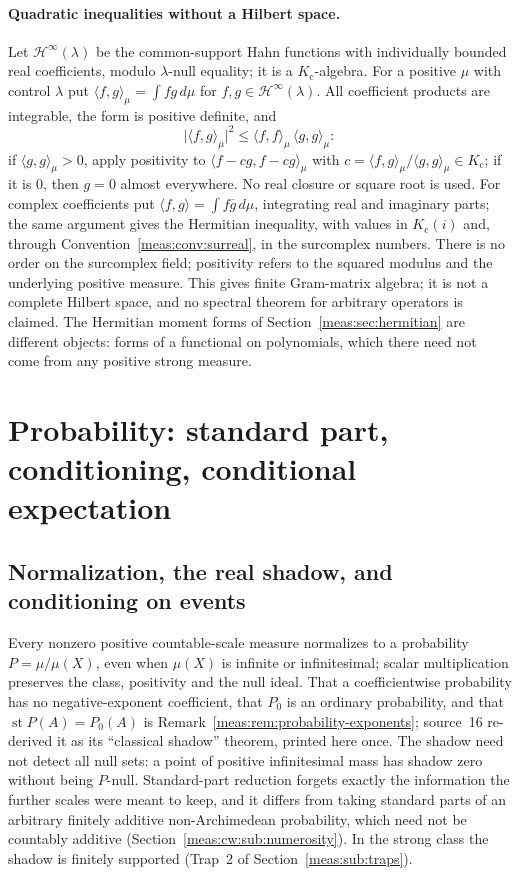 \documentclass[11pt]{article}
\numberwithin{equation}{section}
\theoremstyle{definition}
\theoremstyle{remark}
\newcommand{\st}{\operatorname{st}}
\newcommand{\abs}[1]{\lvert#1\rvert}
\newcommand{\inner}[2]{\langle#1,#2\rangle}
\newcommand{\Kc}{K_{\mathrm c}}
\newcommand{\Hinf}[1]{\mathscr H^\infty(#1)}
\begin{document}
\paragraph{Quadratic inequalities without a Hilbert space.} Let $\Hinf{\lambda}$ be
the common-support Hahn functions with individually bounded real coefficients,
modulo $\lambda$-null equality; it is a $\Kc$-algebra. For a positive $\mu$ with
control $\lambda$ put $\inner fg_\mu=\int fg\,d\mu$ for $f,g\in\Hinf{\lambda}$. All
coefficient products are integrable, the form is positive definite, and
\begin{equation}\label{meas:cw:eq:cs}
 \abs{\inner fg_\mu}^2\le\inner ff_\mu\,\inner gg_\mu :
\end{equation}
if $\inner gg_\mu>0$, apply positivity to $\inner{f-cg}{f-cg}_\mu$ with
$c=\inner fg_\mu/\inner gg_\mu\in\Kc$; if it is $0$, then $g=0$ almost everywhere. No
real closure or square root is used. For complex coefficients put
$\inner fg=\int f\overline g\,d\mu$, integrating real and imaginary parts; the same
argument gives the Hermitian inequality, with values in $\Kc(i)$ and, through
Convention~\ref{meas:conv:surreal}, in the surcomplex numbers. There is no order
on the surcomplex field; positivity refers to the squared modulus and the
underlying positive measure. This gives finite Gram-matrix algebra; it is not a
complete Hilbert space, and no spectral theorem for arbitrary operators is
claimed. The Hermitian moment forms of Section~\ref{meas:sec:hermitian} are
different objects: forms of a functional on polynomials, which there need not
come from any positive strong measure.

\section{Probability: standard part, conditioning, conditional expectation}
\label{meas:cw:sec:probability}

\subsection{Normalization, the real shadow, and conditioning on events}

Every nonzero positive countable-scale measure normalizes to a probability
$P=\mu/\mu(X)$, even when $\mu(X)$ is infinite or infinitesimal; scalar
multiplication preserves the class, positivity and the null ideal. That a
coefficientwise probability has no negative-exponent coefficient, that $P_0$ is an
ordinary probability, and that $\st P(A)=P_0(A)$ is
Remark~\ref{meas:rem:probability-exponents}; source~16 re-derived it as its
``classical shadow'' theorem, printed here once. The shadow need not detect
all null sets: a point of positive infinitesimal mass has shadow zero without
being $P$-null. Standard-part reduction forgets exactly the information the
further scales were meant to keep, and it differs from taking standard parts of
an arbitrary finitely additive non-Archimedean probability, which need not be
countably additive (Section~\ref{meas:cw:sub:numerosity}). In the strong class the
shadow is finitely supported (Trap~2 of Section~\ref{meas:sub:traps}).
\end{document}

